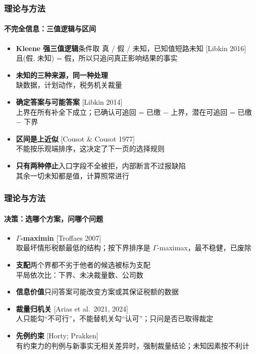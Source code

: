 \documentclass[english, sectionpage=false]{tumbeamer}
\newcommand{\subnote}[1]{{\footnotesize\color{TUMGrayDark} #1}}
\newcommand{\src}[1]{{\scriptsize\color{TUMGray}[#1]}}
\begin{document}
\begin{frame}
  \frametitle{理论与方法}
  \framesubtitle{不完全信息：三值逻辑与区间}
  \begin{itemize}
    \item \textbf{Kleene 强三值逻辑}\quad 条件取 真 / 假 / 未知，已知值短路未知 \src{Libkin 2016}\\
      \subnote{且(假, 未知) = 假，所以只追问真正影响结果的事实}
    \item \textbf{未知的三种来源，同一种处理}\\
      \subnote{缺数据，计划动作，税务机关裁量}
    \item \textbf{确定答案与可能答案} \src{Libkin 2014}\\
      \subnote{上界在所有补全下成立；已确认可追回 = 已缴 − 上界，潜在可追回 = 已缴 − 下界}
    \item \textbf{区间是上近似} \src{Cousot \& Cousot 1977}\\
      \subnote{不能按乐观端排序，这决定了下一页的选择规则}
    \item \textbf{只有两种停止}\quad 入口字段不全被拒，内部断言不过报缺陷\\
      \subnote{其余一切未知都是值，计算照常进行}
  \end{itemize}
\end{frame}

\begin{frame}
  \frametitle{理论与方法}
  \framesubtitle{决策：选哪个方案，问哪个问题}
  \begin{itemize}
    \item \textbf{$\Gamma$-maximin} \src{Troffaes 2007}\\
      \subnote{取最坏情形税额最低的结构；按下界排序是 $\Gamma$-maximax，最不稳健，已废除}
    \item \textbf{支配}\quad 两个界都不劣于他者的候选被标为支配\\
      \subnote{平局依次比：下界、未决裁量数、公司数}
    \item \textbf{信息价值}\quad 只问答案可能改变方案或其保证税额的数据
    \item \textbf{裁量归机关} \src{Arias et al.\ 2021, 2024}\\
      \subnote{人只能勾“不可行”，不能替机关勾“认可”；只问是否已取得裁定}
    \item \textbf{先例约束} \src{Horty; Prakken}\\
      \subnote{有约束力的判例与新事实无相关差异时，强制裁量结论；未知因素按不利计}
  \end{itemize}
\end{frame}
\end{document}
